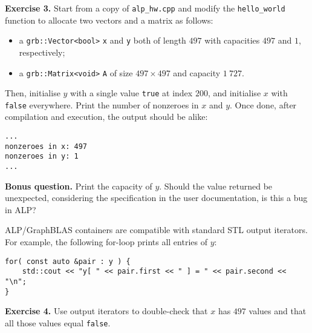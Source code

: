 \noindent \textbf{Exercise 3.} Start from a copy of \texttt{alp\_hw.cpp} and modify the \texttt{hello\_world} function to allocate two vectors and a matrix as follows:
\begin{itemize}
	\item a \texttt{grb::Vector<bool>} \texttt{x} and \texttt{y} both of length $497$ with capacities $497$ and $1$, respectively;
	\item a \texttt{grb::Matrix<void>} \texttt{A} of size $497\times497$ and capacity $1\ 727$.
\end{itemize}
Then, initialise $y$ with a single value \texttt{true} at index $200$, and initialise $x$ with \texttt{false} everywhere. Print the number of nonzeroes in $x$ and $y$. Once done, after compilation and execution, the output should be alike:
\begin{lstlisting}
...
nonzeroes in x: 497
nonzeroes in y: 1
...
\end{lstlisting}

\noindent \textbf{Bonus question.} Print the capacity of $y$. Should the value returned be unexpected, considering the specification in the user documentation, is this a bug in ALP?

ALP/GraphBLAS containers are compatible with standard STL output iterators. For example, the following for-loop prints all entries of $y$:
\begin{lstlisting}
for( const auto &pair : y ) {
	std::cout << "y[ " << pair.first << " ] = " << pair.second << "\n";
}
\end{lstlisting}

\noindent \textbf{Exercise 4.} Use output iterators to double-check that $x$ has $497$ values and that all those values equal \texttt{false}.

